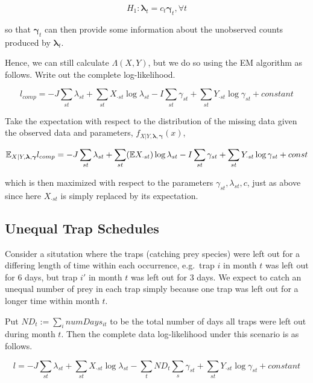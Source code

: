 \documentclass[12pt]{article}\usepackage[]{graphicx}\usepackage[]{color}
\begin{document}
\begin{equation}
  \label{eq:emAlt}
  H_1: \boldsymbol{\lambda}_t = c_t \boldsymbol{\gamma}_t, \forall t
\end{equation}

\noindent so that $\boldsymbol{\gamma}_t$ can then provide some information about the unobserved counts produced by $\boldsymbol{\lambda}_t$.  

Hence, we can still calculate $\Lambda(X,Y)$, but we do so using the EM algorithm as follows.  Write out the complete log-likelihood.

\begin{equation}
  \label{eq:llComp}
  l_{comp} = -J\sum_{st}\lambda_{st} + \sum_{st}X_{\cdot st} \log{\lambda_{st}} - I\sum_{st}\gamma_{st} + \sum_{st}Y_{\cdot st}\log{\gamma_{st}} + constant
\end{equation}

\noindent Take the expectation with respect to the distribution of the missing data given the observed data and parameters, $f_{X|Y,\boldsymbol{\lambda},\boldsymbol{\gamma}}(x)$,

\begin{equation*}
  \mathbb{E}_{X|Y,\boldsymbol{\lambda},\boldsymbol{\gamma}} l_{comp} = -J\sum_{st}\lambda_{st} + \sum_{st}(\mathbb{E} X_{\cdot st}) \log{\lambda_{st}} - I\sum_{st}\gamma_{st} + \sum_{st}Y_{\cdot st}\log{\gamma_{st}} + const
\end{equation*}

which is then maximized with respect to the parameters $\gamma_{st}, \lambda_{st}, c$, just as above since here $X_{\cdot st}$ is simply replaced by its expectation.

\subsection{Unequal Trap Schedules}
Consider a situtation where the traps (catching prey species) were left out for a differing length of time within each occurrence, e.g.\ trap $i$ in month $t$ was left out for $6$ days, but trap $i'$ in month $t$ was left out for $3$ days.  We expect to catch an unequal number of prey in each trap simply because one trap was left out for a longer time within month $t$.  

Put $ND_t := \sum_{i} numDays_{it}$ to be the total number of days all traps were left out during month $t$.  Then the complete data log-likelihood under this scenario is as follows.

\begin{equation*}
  l = -J\sum_{st}\lambda_{st} + \sum_{st}X_{\cdot st} \log{\lambda_{st}} - \sum_{t} ND_t \sum_{s} \gamma_{st} + \sum_{st}Y_{\cdot st}\log{\gamma_{st}} + constant
\end{equation*}
\end{document}
